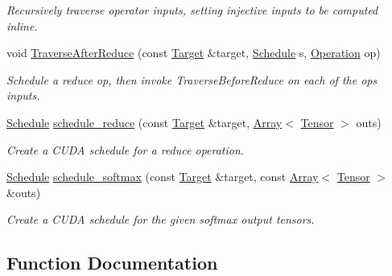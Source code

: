 \begin{DoxyCompactItemize}
\begin{DoxyCompactList}\small\item\em Recursively traverse operator inputs, setting injective inputs to be computed inline. \end{DoxyCompactList}\item 
void \hyperlink{namespacetopi_1_1cuda_a3420d2910f604087789ab4c96850f816}{Traverse\+After\+Reduce} (const \hyperlink{classtvm_1_1Target}{Target} \&target, \hyperlink{classtvm_1_1te_1_1Schedule}{Schedule} s, \hyperlink{classtvm_1_1te_1_1Operation}{Operation} op)
\begin{DoxyCompactList}\small\item\em Schedule a reduce op, then invoke Traverse\+Before\+Reduce on each of the op\textquotesingle{}s inputs. \end{DoxyCompactList}\item 
\hyperlink{classtvm_1_1te_1_1Schedule}{Schedule} \hyperlink{namespacetopi_1_1cuda_aad0c9654034582022e8e81e82ff08349}{schedule\+\_\+reduce} (const \hyperlink{classtvm_1_1Target}{Target} \&target, \hyperlink{classtvm_1_1Array}{Array}$<$ \hyperlink{classtvm_1_1te_1_1Tensor}{Tensor} $>$ outs)
\begin{DoxyCompactList}\small\item\em Create a C\+U\+DA schedule for a reduce operation. \end{DoxyCompactList}\item 
\hyperlink{classtvm_1_1te_1_1Schedule}{Schedule} \hyperlink{namespacetopi_1_1cuda_a068a59d0860e73f880133e87f352629d}{schedule\+\_\+softmax} (const \hyperlink{classtvm_1_1Target}{Target} \&target, const \hyperlink{classtvm_1_1Array}{Array}$<$ \hyperlink{classtvm_1_1te_1_1Tensor}{Tensor} $>$ \&outs)
\begin{DoxyCompactList}\small\item\em Create a C\+U\+DA schedule for the given softmax output tensors. \end{DoxyCompactList}\end{DoxyCompactItemize}


\subsection{Function Documentation}
